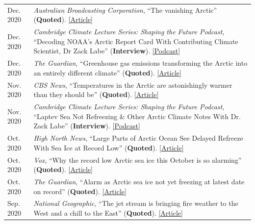 \documentclass[margin,line,palatino,courier,10pt]{res}
\begin{document}
\begin{resume}
\begin{tabular}{@{}p{0.9in}p{4in}}
Dec. 2020 & \textit{Australian Broadcasting Corporation}, ``The vanishing Arctic'' (\textbf{Quoted}). \href{https://www.abc.net.au/news/2020-12-16/arctic-sea-ice-dramatic-transformation-as-seen-by-satellites/12961584?nw=0}{[Article]}\\
Dec. 2020 & \textit{Cambridge Climate Lecture Series: Shaping the Future Podcast}, ``Decoding NOAA's Arctic Report Card With Contributing Climate Scientist, Dr Zack Labe'' (\textbf{Interview}). \href{https://climateseries.com/climate-change-podcast/80-arctic-report-card-zack-labe}{[Podcast]}\\
Dec. 2020 & \textit{The Guardian}, ``Greenhouse gas emissions transforming the Arctic into an entirely different climate'' (\textbf{Quoted}). \href{https://www.theguardian.com/world/2020/dec/08/arctic-report-climate-crisis-wildfires-ice-loss}{[Article]}\\
Nov. 2020 & \textit{CBS News}, ``Temperatures in the Arctic are astonishingly warmer than they should be'' (\textbf{Quoted}). \href{https://www.cbsnews.com/news/climate-change-arctic-temperatures-warmer/}{[Article]}\\
Nov. 2020 & \textit{Cambridge Climate Lecture Series: Shaping the Future Podcast}, ``Laptev Sea Not Refreezing \& Other Arctic Climate Notes With Dr. Zack Labe'' (\textbf{Interview}). \href{https://climateseries.com/climate-change-podcast/74-dr-zack-labe-arctic-laptev-sea}{[Podcast]}\\
Oct. 2020 & \textit{High North News}, ``Large Parts of Arctic Ocean See Delayed Refreeze With Sea Ice at Record Low'' (\textbf{Quoted}). \href{https://www.highnorthnews.com/en/large-parts-arctic-ocean-see-delayed-refreeze-sea-ice-record-low}{[Article]}\\
Oct. 2020 & \textit{Vox}, ``Why the record low Arctic sea ice this October is so alarming'' (\textbf{Quoted}). \href{https://www.vox.com/21536859/arctic-sea-ice-2020-climate-change-alaska-polar-bears-charts}{[Article]}\\
Oct. 2020 & \textit{The Guardian}, ``Alarm as Arctic sea ice not yet freezing at latest date on record'' (\textbf{Quoted}). \href{https://www.theguardian.com/world/2020/oct/22/alarm-as-arctic-sea-ice-not-yet-freezing-at-latest-date-on-record}{[Article]}\\
Sep. 2020 & \textit{National Geographic}, ``The jet stream is bringing fire weather to the West and a chill to the East'' (\textbf{Quoted}). \href{https://www.nationalgeographic.com/science/2020/09/jet-stream-fire-weather-california-chill-eastern-us/}{[Article]}\\

\end{tabular}
\end{resume}
\end{document}
